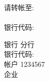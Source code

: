 \parbox{\textwidth}{

  \parbox [t]{.22\textwidth} {
   请转帐至: \\
   \\
   银行代码: \\
   }
  \parbox [t]{.78\textwidth} {
  	 银行 分行 \\
    银行代码: \\  	 
  	 帐户 1234567 \\
  	 企业 \\
   }   
}

